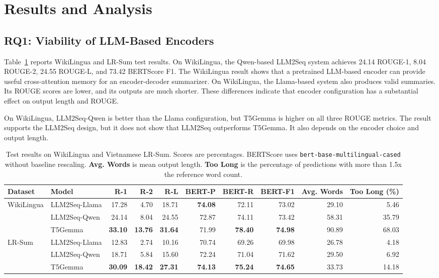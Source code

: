 \documentclass[11pt]{article}
\begin{document}
\section{Results and Analysis}
\label{sec:results}

\subsection{RQ1: Viability of LLM-Based Encoders}

Table~\ref{tab:main-results} reports WikiLingua and LR-Sum test results.
On WikiLingua, the Qwen-based LLM2Seq system achieves 24.14 ROUGE-1, 8.04 ROUGE-2, 24.55 ROUGE-L, and 73.42 BERTScore F1.
The WikiLingua result shows that a pretrained LLM-based encoder can provide useful cross-attention memory for an encoder-decoder summarizer.
On WikiLingua, the Llama-based system also produces valid summaries.
Its ROUGE scores are lower, and its outputs are much shorter.
These differences indicate that encoder configuration has a substantial effect on output length and ROUGE.

On WikiLingua, LLM2Seq-Qwen is better than the Llama configuration, but T5Gemma is higher on all three ROUGE metrics.
The result supports the LLM2Seq design, but it does not show that LLM2Seq outperforms T5Gemma.
It also depends on the encoder choice and output length.

\begin{table}[t]
\centering
\small
\setlength{\tabcolsep}{3pt}
\begin{tabular}{llrrrrrrrr}
\toprule
Dataset & Model & R-1 & R-2 & R-L & BERT-P & BERT-R & BERT-F1 & Avg. Words & Too Long (\%) \\
\midrule
\multirow{3}{*}{WikiLingua} & LLM2Seq-Llama & 17.28 & 4.70 & 18.71 & \textbf{74.08} & 72.11 & 73.02 & 29.10 & 5.46 \\
 & LLM2Seq-Qwen & 24.14 & 8.04 & 24.55 & 72.87 & 74.11 & 73.42 & 58.31 & 35.79 \\
 & T5Gemma & \textbf{33.10} & \textbf{13.76} & \textbf{31.64} & 71.99 & \textbf{78.40} & \textbf{74.98} & 90.89 & 68.03 \\
\midrule
\multirow{3}{*}{LR-Sum} & LLM2Seq-Llama & 12.83 & 2.74 & 10.16 & 70.74 & 69.26 & 69.98 & 26.78 & 4.18 \\
 & LLM2Seq-Qwen & 18.71 & 5.84 & 15.60 & 72.24 & 71.04 & 71.62 & 29.50 & 6.92 \\
 & T5Gemma & \textbf{30.09} & \textbf{18.42} & \textbf{27.31} & \textbf{74.13} & \textbf{75.24} & \textbf{74.65} & 33.73 & 14.18 \\
\bottomrule
\end{tabular}
\caption{Test results on WikiLingua and Vietnamese LR-Sum.
Scores are percentages.
BERTScore uses \texttt{bert-base-multilingual-cased} without baseline rescaling.
\textbf{Avg. Words} is mean output length.
\textbf{Too Long} is the percentage of predictions with more than 1.5x the reference word count.}
\label{tab:main-results}
\end{table}
\end{document}
